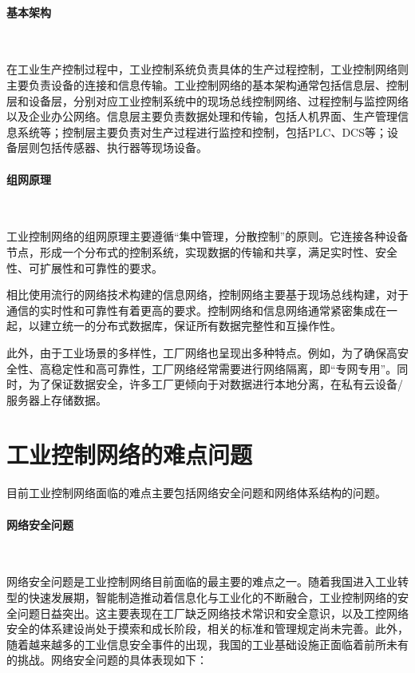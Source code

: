 \documentclass[UTF8]{article}
\begin{document}
\paragraph{基本架构}~{}

在工业生产控制过程中，工业控制系统负责具体的生产过程控制，工业控制网络则主要负责设备的连接和信息传输。工业控制网络的基本架构通常包括信息层、控制层和设备层，分别对应工业控制系统中的现场总线控制网络、过程控制与监控网络以及企业办公网络。信息层主要负责数据处理和传输，包括人机界面、生产管理信息系统等；控制层主要负责对生产过程进行监控和控制，包括PLC、DCS等；设备层则包括传感器、执行器等现场设备。

\paragraph{组网原理}~{}

工业控制网络的组网原理主要遵循“集中管理，分散控制”的原则。它连接各种设备节点，形成一个分布式的控制系统，实现数据的传输和共享，满足实时性、安全性、可扩展性和可靠性的要求。

相比使用流行的网络技术构建的信息网络，控制网络主要基于现场总线构建，对于通信的实时性和可靠性有着更高的要求。控制网络和信息网络通常紧密集成在一起，以建立统一的分布式数据库，保证所有数据完整性和互操作性。

此外，由于工业场景的多样性，工厂网络也呈现出多种特点。例如，为了确保高安全性、高稳定性和高可靠性，工厂网络经常需要进行网络隔离，即“专网专用”。同时，为了保证数据安全，许多工厂更倾向于对数据进行本地分离，在私有云设备/服务器上存储数据。

%
\section{工业控制网络的难点问题}

目前工业控制网络面临的难点主要包括网络安全问题和网络体系结构的问题。

\paragraph{网络安全问题}~{}

网络安全问题是工业控制网络目前面临的最主要的难点之一。随着我国进入工业转型的快速发展期，智能制造推动着信息化与工业化的不断融合，工业控制网络的安全问题日益突出。这主要表现在工厂缺乏网络技术常识和安全意识，以及工控网络安全的体系建设尚处于摸索和成长阶段，相关的标准和管理规定尚未完善。此外，随着越来越多的工业信息安全事件的出现，我国的工业基础设施正面临着前所未有的挑战。网络安全问题的具体表现如下：
\end{document}
